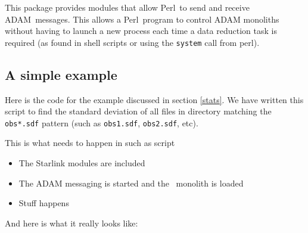 \documentclass[twoside,11pt]{article}
\newcommand{\Kappa}{\xref{{\sc{Kappa}}}{sun95}{}}
\newcommand{\ADAM}{\xref{{ADAM}}{sun144}{}}
\newcommand{\perl}{\xref{\textsf{Perl}}{sun193}{}}
\newcommand{\xref}[3]{#1}
\renewcommand{\_}{\texttt{\symbol{95}}}
\begin{document}
This package provides modules that allow \perl\ to send and receive \ADAM\
messages. This allows a \perl\ program to control ADAM monoliths without having
to launch a new process each time a data reduction task is required (as found
in \xref{shell scripts}{sc4}{} or using the \texttt{system} call from perl).


\subsection{A simple example}

Here is the code for the example discussed in section \ref{stats}. We have
written this script to find the standard deviation of all files in directory
matching the \texttt{obs*.sdf} pattern (such as \texttt{obs1.sdf},
\texttt{obs2.sdf}, etc).

This is what needs to happen in such as script

\begin{itemize}

\item The Starlink modules are included

\item The ADAM messaging is started and the \Kappa\ monolith is loaded

\item Stuff happens

\end{itemize}

And here is what it really looks like:
\end{document}
